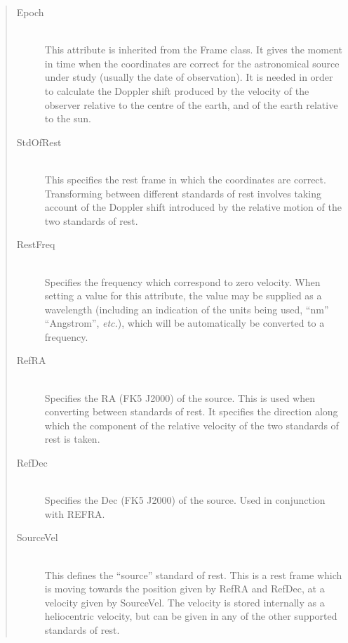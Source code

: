 \documentclass[twoside,11pt]{article}
\begin{document}
\begin{quote}
\begin{description}

\item[Epoch]\mbox{}\\
This attribute is inherited from the Frame class. It gives the moment in
time when the coordinates are correct for the astronomical source
under study (usually the date of observation). It is needed in order to 
calculate the Doppler shift produced by the velocity of the observer
relative to the centre of the earth, and of the earth relative to the sun.

\item[StdOfRest]\mbox{}\\
This specifies the rest frame in which the coordinates are correct.
Transforming between different standards of rest involves taking account
of the Doppler shift introduced by the relative motion of the two
standards of rest. 

\item[RestFreq]\mbox{}\\
Specifies the frequency which correspond to zero velocity. When setting a
value for this attribute, the value may be supplied as a wavelength
(including an indication of the units being used, ``nm'' ``Angstrom'',
\emph{etc.}), which will be automatically be converted to a frequency.

\item[RefRA]\mbox{}\\
Specifies the RA (FK5 J2000) of the source. This is used when converting
between standards of rest. It specifies the direction along which the
component of the relative velocity of the two standards of rest is taken.

\item[RefDec]\mbox{}\\
Specifies the Dec (FK5 J2000) of the source. Used in conjunction with
REFRA.

\item[SourceVel]\mbox{}\\
This defines the ``source'' standard of rest. This is a rest frame which
is moving towards the position given by RefRA and RefDec, at a velocity
given by SourceVel. The velocity is stored internally as a heliocentric
velocity, but can be given in any of the other supported standards of rest.

\end{description}
\end{quote}
\end{document}
